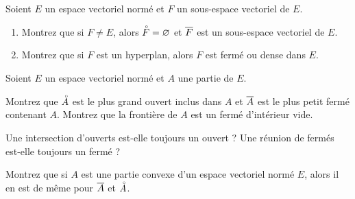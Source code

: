 \begin{corr}
\end{corr}

\begin{exopss}[Exercice 14]
Soient \(E\) un espace vectoriel normé et \(F\) un sous-espace vectoriel de \(E\).

\begin{enumerate}
    \item Montrez que si \(F\not=E\), alors \(\accentset{\circ}{F}=\varnothing\) et \(\overline{F}\) est un sous-espace vectoriel de \(E\). \\
    \item Montrez que si \(F\) est un hyperplan, alors \(F\) est fermé ou dense dans \(E\).
\end{enumerate}
\end{exopss}

\begin{corr}
\end{corr}

\begin{exops}[Exercice 15]
Soient \(E\) un espace vectoriel normé et \(A\) une partie de \(E\).

Montrez que \(\accentset{\circ}{A}\) est le plus grand ouvert inclus dans \(A\) et \(\overline{A}\) est le plus petit fermé contenant \(A\). Montrez que la frontière de \(A\) est un fermé d'intérieur vide.
\end{exops}

\begin{corr}
\end{corr}

\begin{exos}[Exercice 16]
Une intersection d'ouverts est-elle toujours un ouvert ? Une réunion de fermés est-elle toujours un fermé ?
\end{exos}

\begin{corr}
\end{corr}

\begin{exops}[Exercice 17]
Montrez que si \(A\) est une partie convexe d'un espace vectoriel normé \(E\), alors il en est de même pour \(\overline{A}\) et \(\accentset{\circ}{A}\).
\end{exops}

\begin{corr}
\end{corr}

